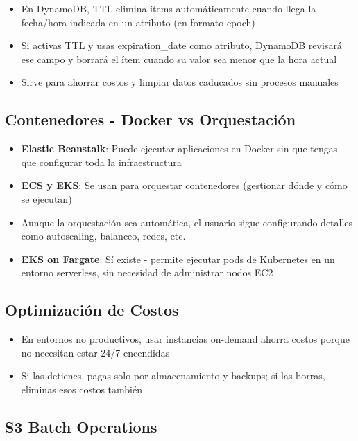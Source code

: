 \documentclass[12pt,a4paper]{report}
\begin{document}
\begin{itemize}
    \item En DynamoDB, TTL elimina ítems automáticamente cuando llega la fecha/hora indicada en un atributo (en formato epoch)
    \item Si activas TTL y usas expiration\_date como atributo, DynamoDB revisará ese campo y borrará el ítem cuando su valor sea menor que la hora actual
    \item Sirve para ahorrar costos y limpiar datos caducados sin procesos manuales
\end{itemize}

\subsection{Contenedores - Docker vs Orquestación}

\begin{itemize}
    \item \textbf{Elastic Beanstalk}: Puede ejecutar aplicaciones en Docker sin que tengas que configurar toda la infraestructura
    \item \textbf{ECS y EKS}: Se usan para orquestar contenedores (gestionar dónde y cómo se ejecutan)
    \item Aunque la orquestación sea automática, el usuario sigue configurando detalles como autoscaling, balanceo, redes, etc.
    \item \textbf{EKS on Fargate}: Sí existe - permite ejecutar pods de Kubernetes en un entorno serverless, sin necesidad de administrar nodos EC2
\end{itemize}

\subsection{Optimización de Costos}

\begin{itemize}
    \item En entornos no productivos, usar instancias on-demand ahorra costos porque no necesitan estar 24/7 encendidas
    \item Si las detienes, pagas solo por almacenamiento y backups; si las borras, eliminas esos costos también
\end{itemize}

\subsection{S3 Batch Operations}
\end{document}
